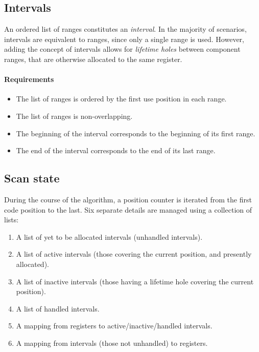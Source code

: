 \documentclass{llncs}
\begin{document}
\subsection{Intervals}
\label{sec:intervals}

An ordered list of ranges constitutes an \emph{interval}.  In the majority of
scenarios, intervals are equivalent to ranges, since only a single range is
used.  However, adding the concept of intervals allows for \emph{lifetime
  holes} between component ranges, that are otherwise allocated to the same
register.

\paragraph{Requirements}

\begin{itemize}
\item The list of ranges is ordered by the first use position in each range.
\item The list of ranges is non-overlapping.
\item The beginning of the interval corresponds to the beginning of its first
  range.
\item The end of the interval corresponds to the end of its last range.
\end{itemize}

\subsection{Scan state}
\label{sec:scanstate}

During the course of the algorithm, a position counter is iterated from the
first code position to the last.  Six separate details are managed using a
collection of lists:

\begin{enumerate}
\item A list of yet to be allocated intervals (unhandled intervals).
\item A list of active intervals (those covering the current position, and
  presently allocated).
\item A list of inactive intervals (those having a lifetime hole covering the
  current position).
\item A list of handled intervals.
\item A mapping from registers to active/inactive/handled intervals.
\item A mapping from intervals (those not unhandled) to registers.
\end{enumerate}
\end{document}
